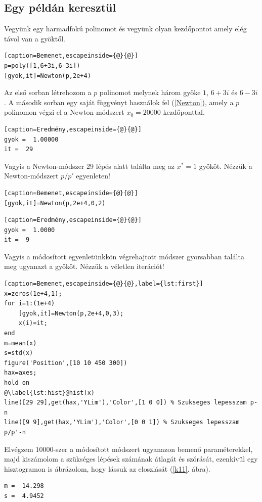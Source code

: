 \documentclass[a4paper,12pt]{report}
\begin{document}
                \subsection{Egy példán keresztül}
				Vegyünk egy harmadfokú polinomot és vegyünk olyan kezdőpontot amely elég távol van a gyöktől.
				\begin{singlespace}
                \begin{lstlisting}[caption=Bemenet,escapeinside={@}{@}]
p=poly([1,6+3i,6-3i])
[gyok,it]=Newton(p,2e+4)
				\end{lstlisting}
                \end{singlespace}
				Az első sorban létrehozom a $p$ polinomot melynek három gyöke $1$, $6+3i$ és $6-3i$. A második sorban egy saját függvényt használok fel (\ref{Newton}), amely a $p$ polinomon végzi el a Newton-módszert $x_0=20000$ kezdőponttal.
				\begin{singlespace}
                \begin{lstlisting}[caption=Eredmény,escapeinside={@}{@}]
gyok =  1.00000
it =  29
				\end{lstlisting}
                \end{singlespace}
				Vagyis a Newton-módszer 29 lépés alatt találta meg az $x^*=1$ gyököt. Nézzük a Newton-módszert $p/p'$ egyenleten!
				\begin{singlespace}
                \begin{lstlisting}[caption=Bemenet,escapeinside={@}{@}]
[gyok,it]=Newton(p,2e+4,0,2)
				\end{lstlisting}
				\begin{lstlisting}[caption=Eredmény,escapeinside={@}{@}]
gyok =  1.0000
it =  9
				\end{lstlisting}
                \end{singlespace}
				Vagyis a módosított egyenletünkkön végrehajtott módszer gyorsabban találta meg ugyanazt a gyököt. Nézzük a véletlen iterációt!
				\begin{singlespace}
                \begin{lstlisting}[caption=Bemenet,escapeinside={@}{@},label={lst:first}]
x=zeros(1e+4,1);
for i=1:(1e+4)
	[gyok,it]=Newton(p,2e+4,0,3);
	x(i)=it;
end
m=mean(x)
s=std(x)
figure('Position',[10 10 450 300])
hax=axes;
hold on
@\label{lst:hist}@hist(x)
line([29 29],get(hax,'YLim'),'Color',[1 0 0]) % Szukseges lepesszam p-n
line([9 9],get(hax,'YLim'),'Color',[0 0 1]) % Szukseges lepesszam p/p'-n
				\end{lstlisting}
                \end{singlespace}
				Elvégzem $10000$-szer a módosított módszert ugyanazon bemenő paraméterekkel, majd kiszámolom a szükséges lépések számának átlagát és szórását, ezenkívül egy hisztogramon is ábrázolom, hogy lássuk az eloszlását (\ref{k11}. ábra).
				\begin{singlespace}
                \begin{lstlisting}[caption=Eredmény]
m =  14.298
s =  4.9452
				\end{lstlisting}
				\end{singlespace}
\end{document}
